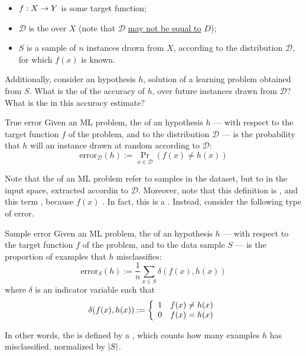 \documentclass[a4paper, 12pt]{report}
\begin{document}
    \begin{itemize}
        \item $\func{f}{X}{Y}$ is some target function;
        \item $\mathcal D$ is the  over $X$ (note that $\mathcal D$ \underline{may not be equal to} $D$);
        \item $S$ is a sample of $n$ instances drawn from $X$, according to the distribution $\mathcal D$, for which $f(x)$ is known.
    \end{itemize}

    Additionally, consider an hypothesis $h$, solution of a learning problem obtained from $S$. What is the  of the accuracy of $h$, over future instances drawn from $\mathcal D$? What is the  in this accuracy estimate?

    \begin{frameddefn}{True error}
        Given an ML problem, the  of an hypothesis $h$ --- with respect to the target function $f$ of the problem, and to the distribution $\mathcal D$ --- is the probability that $h$ will  an instance drawn at random according to $\mathcal D$: $$\mathrm{error}_\mathcal D (h) := \Pr_{x \in \mathcal D}{(f(x) \neq h(x))}$$
    \end{frameddefn}

    Note that the  of an ML problem  refer to samples in the dataset, but to  in the input space, extracted accordin to $\mathcal D$. Moreover, note that this definition is , and this term , because $f(x)$ . In fact, this is a . Instead, consider the following type of error.

    \begin{frameddefn}{Sample error}
        Given an ML problem, the  of an hypothesis $h$ --- with respect to the target function $f$ of the problem, and to the data sample $S$ --- is the proportion of examples that $h$ misclassifies: $$\mathrm{error}_S(h) := \dfrac{1}{n} \sum_{x \in S}{\delta(f(x), h(x))}$$ where $\delta$ is an indicator variable such that $$\delta(f(x), h(x)) := \soe{ll}{1 & f(x) \neq h(x) \\ 0 & f(x) = h(x)}$$
    \end{frameddefn}

    In other words, the  is defined by a , which counts how many examples $h$ has misclassified, normalized by $\abs S$.
\end{document}
